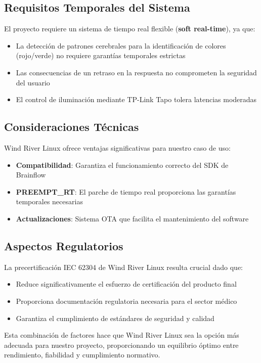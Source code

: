     \subsection{Requisitos Temporales del Sistema}
        El proyecto requiere un sistema de tiempo real flexible (\textbf{soft real-time}), ya que:
        \begin{itemize}
            \item La detección de patrones cerebrales para la identificación de colores (rojo/verde) no requiere garantías temporales estrictas
            \item Las consecuencias de un retraso en la respuesta no comprometen la seguridad del usuario
            \item El control de iluminación mediante TP-Link Tapo tolera latencias moderadas
        \end{itemize}

    \subsection{Consideraciones Técnicas}
        Wind River Linux ofrece ventajas significativas para nuestro caso de uso:
        \begin{itemize}
            \item \textbf{Compatibilidad}: Garantiza el funcionamiento correcto del SDK de Brainflow
            \item \textbf{PREEMPT\_RT}: El parche de tiempo real proporciona las garantías temporales necesarias
            \item \textbf{Actualizaciones}: Sistema OTA que facilita el mantenimiento del software
        \end{itemize}

    \subsection{Aspectos Regulatorios}
        La precertificación IEC 62304 de Wind River Linux resulta crucial dado que:
        \begin{itemize}
            \item Reduce significativamente el esfuerzo de certificación del producto final
            \item Proporciona documentación regulatoria necesaria para el sector médico
            \item Garantiza el cumplimiento de estándares de seguridad y calidad
        \end{itemize}

    Esta combinación de factores hace que Wind River Linux sea la opción más adecuada para nuestro proyecto, proporcionando un equilibrio óptimo entre rendimiento, fiabilidad y cumplimiento normativo.
